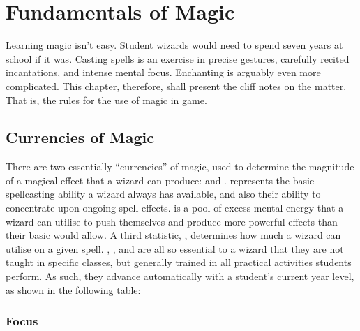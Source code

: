 \chapter{Fundamentals of Magic}

Learning magic isn't easy.
Student wizards would need to spend seven years at school if it was.
Casting spells is an exercise in precise gestures, carefully recited incantations, and intense mental focus.
Enchanting is arguably even more complicated.
This chapter, therefore, shall present the cliff notes on the matter. %
That is, the rules for the use of magic in game.

\section{Currencies of Magic}

There are two essentially ``currencies'' of magic, used to determine the magnitude of a magical effect that a wizard can produce: {\focus} and {\mana}.
\capital{\focus} represents the basic spellcasting ability a wizard always has available, and also their ability to concentrate upon ongoing spell effects.
\capital{\mana} is a pool of excess mental energy that a wizard can utilise to push themselves and produce more powerful effects than their basic {\focus} would allow.
A third statistic, {\overchannel}, determines how much {\mana} a wizard can utilise on a given spell.
\capital{\focus}, {\mana}, and {\overchannel} are all so essential to a wizard that they are not taught in specific classes, but generally trained in all practical activities students perform.
As such, they advance automatically with a student's current year level, as shown in the following table:

\subsection{Focus}

